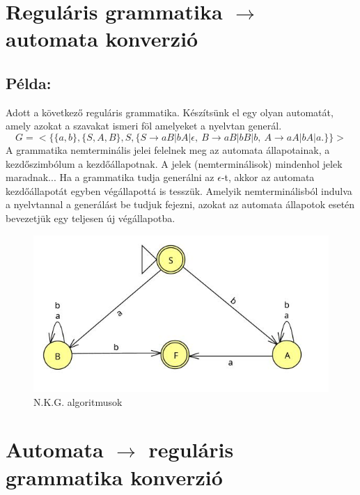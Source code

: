 \documentclass[12pt]{article}
\begin{document}
\section{Reguláris grammatika $\rightarrow$ automata konverzió}
\subsection{Példa:}
Adott a következő reguláris grammatika. Készítsünk el egy olyan automatát, amely azokat a szavakat ismeri föl
amelyeket a nyelvtan generál.
$$ G=<\{ \{a,b\}, \{S,A,B \}, S,
\{ S \rightarrow aB|bA|\epsilon, \ B \rightarrow aB|bB|b, \ A \rightarrow aA|bA|a. \} \}> $$
A grammatika nemterminális jelei felelnek meg az automata állapotainak, a kezdőszimbólum a kezdőállapotnak.
A jelek (nemterminálisok) mindenhol jelek maradnak...
Ha a grammatika tudja generálni az $\epsilon$-t, akkor az automata kezdőállapotát egyben végállapottá is
tesszük. Amelyik nemterminálisból indulva a nyelvtannal a generálást be tudjuk fejezni, azokat az automata
állapotok esetén bevezetjük egy teljesen új végállapotba.

\begin{figure}[h]
  \centering
  \includegraphics[width=0.7\linewidth]{img/g_to_a.jpg} 
  \caption{N.K.G. algoritmusok}
  \label{fig:your_label}
\end{figure}

\section{Automata $\rightarrow$ reguláris grammatika konverzió}
\end{document}
